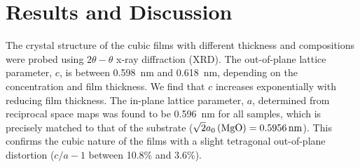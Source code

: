 \documentclass[reprint,aip,apl,floatfix,linenumbers,superscriptaddress]{revtex4-1}
\begin{document}
%

\section{Results and Discussion}
\label{sec:results_discussion}

The crystal structure of the cubic  films with different thickness 
and compositions were probed using $2\theta-\theta$ x-ray diffraction (XRD). 
The out-of-plane lattice parameter, $c$, is between \SI{0.598}{\nano\metre} 
and \SI{0.618}{\nano\metre}, depending on the  concentration and film 
thickness. We find that  $c$ increases exponentially with reducing film 
thickness. The in-plane lattice parameter, $a$, determined from reciprocal 
space maps was found to be \SI{0.596}{\nano\metre} for all samples, which is 
precisely matched to that of the  substrate ($\sqrt{2} a_0\left(\ce{
MgO} \right)  = \SI{0.5956}{\nano\metre}$). This confirms the cubic nature of 
the  films with a slight tetragonal out-of-plane distortion ($c/a-1$ 
between \num{1 .8}\% and \num{3.6}\%).
\end{document}
